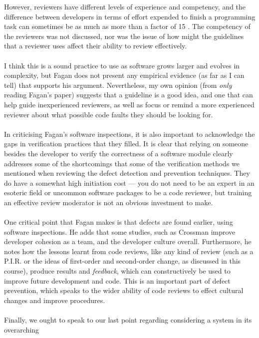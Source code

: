 However, reviewers have different levels of experience and competency, and the difference between
developers in terms of effort expended to finish a programming task can sometimes be as much as more
than a factor of 15 \FIXME.
The competency of the reviewers was not discussed, nor was the issue of how might the guidelines
that a reviewer uses affect their ability to review effectively.\\
\\
I think this is a sound practice to use as software grows larger and evolves in complexity, but
Fagan does not present any empirical evidence (as far as I can tell) that supports his argument.
Nevertheless, my own opinion (from {\em only} reading Fagan's paper) suggests that a guideline is a
good idea, and one that can help guide inexperienced reviewers, as well as focus or remind a more
experienced reviewer about what possible code faults they should be looking for.\\
\\
In criticising Fagan's software inspections, it is also important to acknowledge the gaps in
verification practices that they filled.
It is clear that relying on someone besides the developer to verify the correctness of a software
module clearly addresses some of the shortcomings that some of the verification methods we mentioned
when reviewing the defect detection and prevention techniques.
They do have a somewhat high initiation cost --- you do not need to be an expert in an esoteric field
or uncommon software packages to be a code reviewer, but training an effective review moderator is
not an obvious investment to make.\\
\\
One critical point that Fagan makes is that defects are found earlier, using software inspections.
He adds that some studies, such as Crossman \cite{crossman1977some} improve developer cohesion as a
team, and the developer culture overall.
Furthermore, he notes how the lessons learnt from code reviews, like any kind of review (such as a
P.I.R. or the ideas of first-order and second-order change, as discussed in this course), produce
results and {\em feedback}, which can constructively be used to improve future development and code.
This is an important part of defect prevention, which speaks to the wider ability of code reviews to
effect cultural changes and improve procedures.\\
\\
Finally, we ought to speak to our last point regarding considering a system in its overarching
